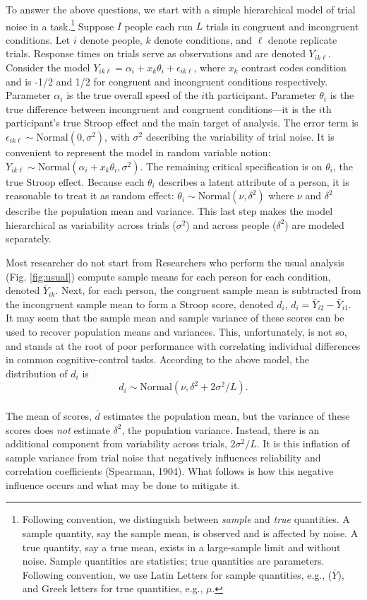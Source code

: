 \documentclass[
  ,man]{apa6}
\begin{document}
To answer the above questions, we start with a simple hierarchical model of trial noise in a task.\footnote{Following convention, we distinguish between \emph{sample} and \emph{true} quantities. A sample quantity, say the sample mean, is observed and is affected by noise. A true quantity, say a true mean, exists in a large-sample limit and without noise. Sample quantities are statistics; true quantities are parameters. Following convention, we use Latin Letters for sample quantities, e.g., (\(\bar{Y}\)), and Greek letters for true quantities, e.g., \(\mu\).} Suppose \(I\) people each run \(L\) trials in congruent and incongruent conditions. Let \(i\) denote people, \(k\) denote conditions, and \(\ell\) denote replicate trials. Response times on trials serve as observations and are denoted \(Y_{ik\ell}\). Consider the model \(Y_{ik\ell} = \alpha_i +x_k\theta_i+\epsilon_{ik\ell}\), where \(x_k\) contrast codes condition and is -1/2 and 1/2 for congruent and incongruent conditions respectively. Parameter \(\alpha_i\) is the true overall speed of the \(i\)th participant. Parameter \(\theta_i\) is the true difference between incongruent and congruent conditions---it is the \(i\)th participant's true Stroop effect and the main target of analysis. The error term is \(\epsilon_{ik\ell} \sim \mbox{Normal}(0,\sigma^2)\), with \(\sigma^2\) describing the variability of trial noise. It is convenient to represent the model in random variable notion: \(Y_{ik\ell} \sim \mbox{Normal}(\alpha_i +x_k\theta_i,\sigma^2)\). The remaining critical specification is on \(\theta_i\), the true Stroop effect. Because each \(\theta_i\) describes a latent attribute of a person, it is reasonable to treat it as random effect: \(\theta_i \sim \mbox{Normal}(\nu,\delta^2)\) where \(\nu\) and \(\delta^2\) describe the population mean and variance. This last step makes the model hierarchical as variability across trials (\(\sigma^2\)) and across people (\(\delta^2\)) are modeled separately.

Most researcher do not start from
Researchers who perform the usual analysis (Fig. \ref{fig:usual}) compute sample means for each person for each condition, denoted \(\bar{Y}_{ik}\). Next, for each person, the congruent sample mean is subtracted from the incongruent sample mean to form a Stroop score, denoted \(d_i\), \(d_i=\bar{Y}_{i2}-\bar{Y}_{i1}\). It may seem that the sample mean and sample variance of these scores can be used to recover population means and variances. This, unfortunately, is not so, and stands at the root of poor performance with correlating individual differences in common cognitive-control tasks. According to the above model, the distribution of \(d_i\) is
\[d_i \sim \mbox{Normal}(\nu,\delta^2+2\sigma^2/L).\]\\
The mean of scores, \(\bar{d}\) estimates the population mean, but the variance of these scores does \emph{not} estimate \(\delta^2\), the population variance. Instead, there is an additional component from variability across trials, \(2\sigma^2/L\). It is this inflation of sample variance from trial noise that negatively influences reliability and correlation coefficients (Spearman, 1904). What follows is how this negative influence occurs and what may be done to mitigate it.
\end{document}
